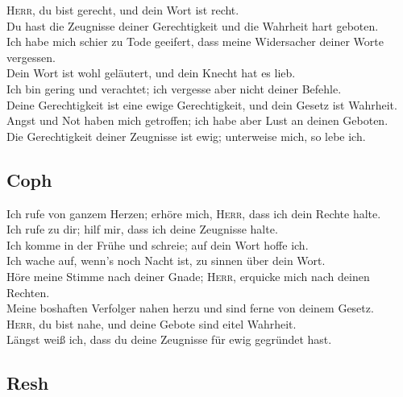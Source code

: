  \textsc{Herr}, du bist gerecht, und dein Wort ist
recht.\\
 Du hast die Zeugnisse deiner Gerechtigkeit und die
Wahrheit hart geboten.\\
 Ich habe mich schier zu Tode geeifert, dass meine
Widersacher deiner Worte vergessen.\\
 Dein Wort ist wohl geläutert, und dein Knecht hat es
lieb.\\
 Ich bin gering und verachtet; ich vergesse aber nicht
deiner Befehle.\\
 Deine Gerechtigkeit ist eine ewige Gerechtigkeit, und
dein Gesetz ist Wahrheit.\\
 Angst und Not haben mich getroffen; ich habe aber Lust
an deinen Geboten.\\
 Die Gerechtigkeit deiner Zeugnisse ist ewig; unterweise
mich, so lebe ich.

\hypertarget{coph}{%
\subsection{Coph}\label{coph}}

 Ich rufe von ganzem Herzen; erhöre mich, \textsc{Herr},
dass ich dein Rechte halte.\\
 Ich rufe zu dir; hilf mir, dass ich deine Zeugnisse
halte.\\
 Ich komme in der Frühe und schreie; auf dein Wort hoffe
ich.\\
 Ich wache auf, wenn's noch Nacht ist, zu sinnen über
dein Wort.\\
 Höre meine Stimme nach deiner Gnade; \textsc{Herr},
erquicke mich nach deinen Rechten.\\
 Meine boshaften Verfolger nahen herzu und sind ferne
von deinem Gesetz.\\
 \textsc{Herr}, du bist nahe, und deine Gebote sind
eitel Wahrheit.\\
 Längst weiß ich, dass du deine Zeugnisse für ewig
gegründet hast.

\hypertarget{resh}{%
\subsection{Resh}\label{resh}}

